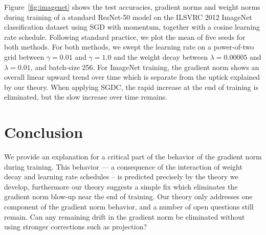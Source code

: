 \documentclass[]{fairmeta}
\begin{document}
Figure~\ref{fig:imagenet} shows the test accuracies, gradient norms and weight norms during training of a standard ResNet-50 model \citep{he2016deep} on the ILSVRC 2012 ImageNet \citep{ILSVRC15} classification dataset using SGD with momentum, together with a cosine learning rate schedule. Following standard practice, we plot the mean of five seeds for both methods. For both methods, we swept the learning rate on a power-of-two grid between $\gamma=0.01$ and $\gamma=1.0$ and the weight decay between $\lambda=0.00005$ and $\lambda=0.01$, and batch-size 256. For ImageNet training, the gradient norm shows an overall linear upward trend over time which is separate from the uptick explained by our theory. When applying SGDC, the rapid increase at the end of training is eliminated, but the slow increase over time remains. 

\section*{Conclusion}
We provide an explanation for a critical part of the behavior of the gradient norm during training. This behavior --- a consequence of the interaction of weight decay and learning rate schedules -- is predicted precisely by the theory we develop, furthermore our theory suggests a simple fix which eliminates the gradient norm blow-up near the end of training. Our theory only addresses one component of the gradient norm behavior, and a number of open questions still remain. Can any remaining drift in the gradient norm be eliminated without using stronger corrections such as projection?



\end{document}
